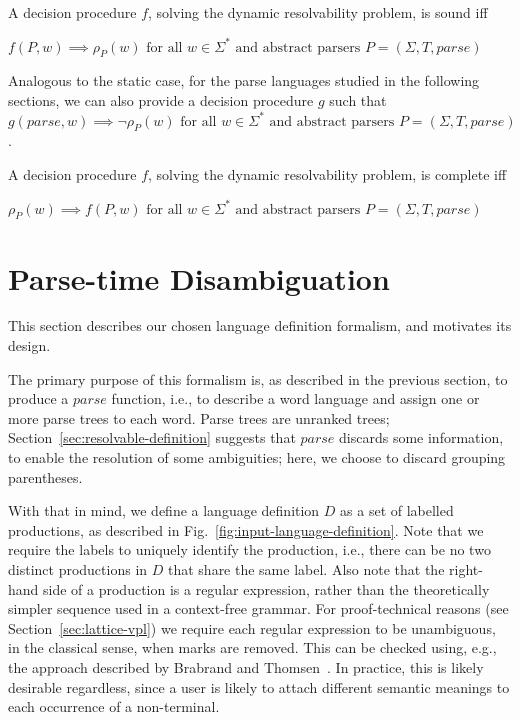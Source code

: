 \documentclass[runningheads]{llncs}
\newcommand{\T}{\Sigma} %
\newcommand{\parse}{\mathit{parse}} %
\begin{document}
\begin{definition}\label{def:dynamic-procedure-sound}
  A decision procedure $f$, solving the dynamic resolvability problem, is sound iff

  $f(P, w) \implies \rho_P(w) \text{ for all } w \in \Sigma^{*} \text{ and abstract parsers } P = (\T, T, \parse)$
\end{definition}

\noindent Analogous to the static case, for the parse languages studied in the
following sections, we can also provide a decision procedure $g$ such
that $g(\parse, w) \implies \lnot \rho_P(w) \text{ for all } w \in
\Sigma^{*} \text{ and abstract parsers } P = (\T, T, \parse)$.

\begin{definition}\label{def:dynamic-procedure-complete}
  A decision procedure $f$, solving the dynamic resolvability problem, is complete iff

  $\rho_P(w) \implies f(P, w) \text{ for all } w \in \Sigma^{*} \text{ and abstract parsers } P = (\T, T, \parse)$
\end{definition}


\section{Parse-time Disambiguation} \label{sec:parse-time-disambiguation}

This section describes our chosen language definition formalism, and motivates its design.

The primary purpose of this formalism is, as described in the previous section, to produce a $\parse$ function, i.e., to describe a word language and assign one or more parse trees to each word. Parse trees are unranked trees; Section~\ref{sec:resolvable-definition} suggests that $\parse$ discards some information, to enable the resolution of some ambiguities; here, we choose to discard grouping parentheses.

With that in mind, we define a language definition $D$ as a set of labelled productions, as described in Fig.~\ref{fig:input-language-definition}. Note that we require the labels to uniquely identify the production, i.e., there can be no two distinct productions in $D$ that share the same label. Also note that the right-hand side of a production is a regular expression, rather than the theoretically simpler sequence used in a context-free grammar. For proof-technical reasons (see Section~\ref{sec:lattice-vpl}) we require each regular expression to be unambiguous, in the classical sense, when marks are removed. This can be checked using, e.g., the approach described by Brabrand and Thomsen~\cite{brabrandTypedUnambiguousPattern2010}. In practice, this is likely desirable regardless, since a user is likely to attach different semantic meanings to each occurrence of a non-terminal.
\end{document}
